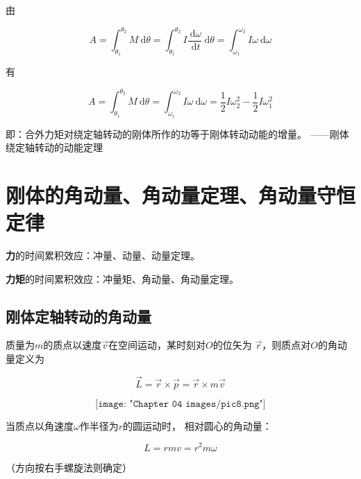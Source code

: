 \documentclass[
	12pt, %
	a4paper, %
]{myLegrandOrangeBook}
\begin{document}
    由

    \begin{equation*}
        A=\int_{\theta_1}^{\theta_2} M \mathrm{~d} \theta=\int_{\theta_1}^{\theta_2} I \frac{\mathrm{~d} \omega}{\mathrm{~d} t} \mathrm{~d} \theta=\int_{\omega_1}^{\omega_2} I \omega \mathrm{~d} \omega
    \end{equation*}

    有

    \begin{equation}
        A=\int_{\theta_1}^{\theta_2} M \mathrm{~d} \theta=\int_{\omega_1}^{\omega_2} I \omega \mathrm{~d} \omega=\frac{1}{2} I \omega_2^2-\frac{1}{2} I \omega_1^2
    \end{equation}

    即：合外力矩对绕定轴转动的刚体所作的功等于刚体转动动能的增量。
    ——刚体绕定轴转动的动能定理

\section{刚体的角动量、角动量定理、角动量守恒定律}

    \textbf{力}的时间累积效应：冲量、动量、动量定理。

    \textbf{力矩}的时间累积效应：冲量矩、角动量、角动量定理。

\subsection{刚体定轴转动的角动量}

\begin{definition}[质点的角动量]
    质量为\(m\)的质点以速度\(\overrightarrow{v}\)在空间运动，某时刻对\(O\)的位矢为
    \(\overrightarrow{r}\)，则质点对\(O\)的角动量定义为

    \begin{equation}
        \overrightarrow{L} = \overrightarrow{r} \times \overrightarrow{p}
        = \overrightarrow{r} \times m \overrightarrow{v}
    \end{equation}

    \[
        \texttt{[image: "Chapter 04 images/pic8.png"]}
        \label{pic4-8}
    \]

    当质点以角速度\(\omega\)作半径为\(r\)的圆运动时，
    相对圆心的角动量：

    \begin{equation}
        L = r m v = r^2 m \omega
    \end{equation}
    
    （方向按右手螺旋法则确定）
\end{definition}
\end{document}
